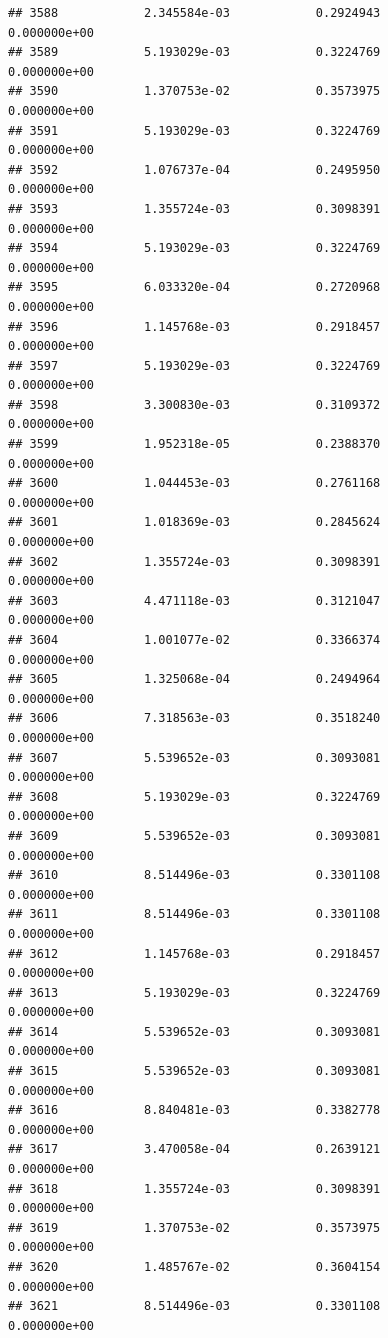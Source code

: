 \documentclass[
]{article}
\begin{document}
\begin{verbatim}
## 3588            2.345584e-03            0.2924943            0.000000e+00
## 3589            5.193029e-03            0.3224769            0.000000e+00
## 3590            1.370753e-02            0.3573975            0.000000e+00
## 3591            5.193029e-03            0.3224769            0.000000e+00
## 3592            1.076737e-04            0.2495950            0.000000e+00
## 3593            1.355724e-03            0.3098391            0.000000e+00
## 3594            5.193029e-03            0.3224769            0.000000e+00
## 3595            6.033320e-04            0.2720968            0.000000e+00
## 3596            1.145768e-03            0.2918457            0.000000e+00
## 3597            5.193029e-03            0.3224769            0.000000e+00
## 3598            3.300830e-03            0.3109372            0.000000e+00
## 3599            1.952318e-05            0.2388370            0.000000e+00
## 3600            1.044453e-03            0.2761168            0.000000e+00
## 3601            1.018369e-03            0.2845624            0.000000e+00
## 3602            1.355724e-03            0.3098391            0.000000e+00
## 3603            4.471118e-03            0.3121047            0.000000e+00
## 3604            1.001077e-02            0.3366374            0.000000e+00
## 3605            1.325068e-04            0.2494964            0.000000e+00
## 3606            7.318563e-03            0.3518240            0.000000e+00
## 3607            5.539652e-03            0.3093081            0.000000e+00
## 3608            5.193029e-03            0.3224769            0.000000e+00
## 3609            5.539652e-03            0.3093081            0.000000e+00
## 3610            8.514496e-03            0.3301108            0.000000e+00
## 3611            8.514496e-03            0.3301108            0.000000e+00
## 3612            1.145768e-03            0.2918457            0.000000e+00
## 3613            5.193029e-03            0.3224769            0.000000e+00
## 3614            5.539652e-03            0.3093081            0.000000e+00
## 3615            5.539652e-03            0.3093081            0.000000e+00
## 3616            8.840481e-03            0.3382778            0.000000e+00
## 3617            3.470058e-04            0.2639121            0.000000e+00
## 3618            1.355724e-03            0.3098391            0.000000e+00
## 3619            1.370753e-02            0.3573975            0.000000e+00
## 3620            1.485767e-02            0.3604154            0.000000e+00
## 3621            8.514496e-03            0.3301108            0.000000e+00

\end{verbatim}
\end{document}
